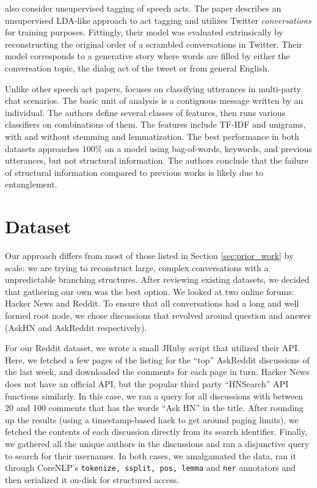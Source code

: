 \documentclass{article}
\begin{document}
 also consider unsupervised tagging of speech
acts. The paper describes an unsupervised LDA-like approach to act tagging and
utilizes Twitter \textit{conversations} for training purposes. Fittingly,
their model was evaluated extrinsically by reconstructing the original order
of a scrambled conversations in Twitter. Their model corresponds to a
generative story where words are filled by either the conversation topic, the
dialog act of the tweet or from general English.

Unlike other speech act papers,  focuses on classifying
utterances in multi-party chat scenarios. The basic unit of analysis is a
contiguous message written by an individual. The authors define several
classes of features, then runs various classifiers on combinations of them.
The features include TF-IDF and unigrams, with and without stemming and
lemmatization.  The best performance in both datasets approaches 100\% on a
model using bag-of-words, keywords, and previous utterances, but not
structural information. The authors conclude that the failure of structural
information compared to previous works is likely due to entanglement.

\section{Dataset}
\label{sec:dataset}
Our approach differs from most of those listed in Section \ref{sec:prior_work}
by scale: we are trying to reconstruct large, complex conversations with a
unpredictable branching structures. After reviewing existing datasets, we
decided that gathering our own was the best option. We looked at two online
forums: Hacker News and Reddit. To ensure that all conversations had a long
and well formed root node, we chose discussions that revolved around question
and answer (AskHN and AskReddit respectively).

For our Reddit dataset, we wrote a small JRuby script that utilized their API.
Here, we fetched a few pages of the listing for the ``top'' AskReddit
discussions of the last week, and downloaded the comments for each page in
turn. Hacker News does not have an official API, but the popular third party
``HNSearch'' API functions similarly. In this case, we ran a query for all
discussions with between 20 and 100 comments that has the words ``Ask HN'' in
the title. After rounding up the results (using a timestamp-based hack to get
around paging limits), we fetched the contents of each discussion directly
from its search identifier. Finally, we gathered all the unique authors in the
discussions and ran a disjunctive query to search for their usernames. In both
cases, we amalgamated the data, ran it through CoreNLP's \texttt{tokenize,
ssplit, pos, lemma} and \texttt{ner} annotators and then serialized it on-disk
for structured access.
\end{document}
